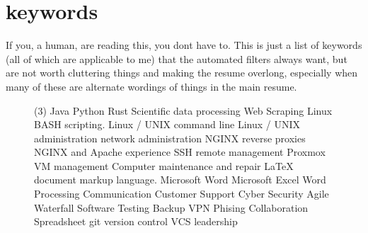 \documentclass[letterpaper,10pt]{article}
\begin{document}
	\newpage
\section*{keywords}
	If you, a human, are reading this, you dont have to. This is just a list of keywords (all of which are applicable to me) that the automated filters always want, but are not worth cluttering things and making the resume overlong, especially when many of these are alternate wordings of things in the main resume.
	\begin{figure}[!ht] \centering
		\begin{tasks}[style=itemize](3)
				\task Java
				\task Python
				\task Rust
				\task Scientific data processing
				\task Web Scraping
				\task Linux BASH scripting.
				\task Linux / UNIX command line
				\task Linux / UNIX administration
				\task network administration
				\task NGINX reverse proxies
				\task NGINX and Apache experience
				\task SSH remote management
				\task Proxmox VM management
				\task Computer maintenance and repair
				\task LaTeX document markup language.
				\task Microsoft Word
				\task Microsoft Excel
				\task Word Processing
				\task Communication
				\task Customer Support
				\task Cyber Security
				\task Agile
				\task Waterfall
				\task Software Testing
				\task Backup
				\task VPN
				\task Phising
				\task Collaboration
				\task Spreadsheet
				\task git
				\task version control
				\task VCS
				\task leadership
		\end{tasks}
	\end{figure}
\end{document}
